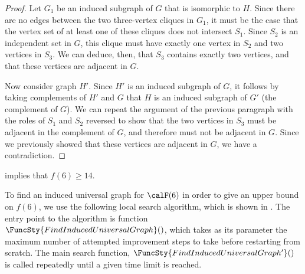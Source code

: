 \begin{proof}
    Let $G_1$ be an induced
    subgraph of $G$ that is isomorphic to $H$.  Since there are
    no edges between the two three-vertex cliques in $G_1$, it must be the case that the
    vertex set of at least one of these cliques does not intersect $S_1$.
    Since $S_2$ is an independent set in $G$, this clique must have exactly
    one vertex in $S_2$ and two vertices in $S_3$.  We can deduce, then, that
    $S_3$ contains exactly two vertices, and that these vertices are adjacent in $G$.

    Now consider graph $H'$.  Since $H'$ is an induced subgraph of $G$, it
    follows by taking complements of $H'$ and $G$ that $H$ is an induced
    subgraph of $G'$ (the complement of $G$).  We can repeat the argument
    of the previous paragraph with the roles of $S_1$ and $S_2$ reversed to
    show that the two vertices in $S_3$ must be adjacent in the complement of
    $G$, and therefore must not be adjacent in $G$.  Since we previously showed that
    these vertices are adjacent in $G$, we have a contradiction.
\end{proof}

 implies that $f(6) \geq 14$.

To find an induced universal graph for $\calF(6)$ in order to give an upper bound
on $f(6)$, we use the following local search
algorithm, which is shown in .
The entry point to the algorithm is function $\FuncSty{FindInducedUniversalGraph}()$,
which takes as its parameter the maximum number of attempted improvement steps to
take before restarting from scratch.  The main search function,
$\FuncSty{FindInducedUniversalGraph'}()$ is called repeatedly until
a given time limit is reached.

